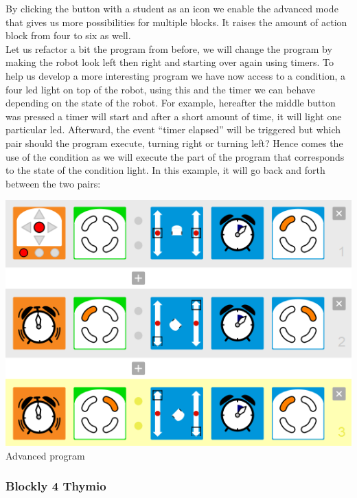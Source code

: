 \documentclass{scrartcl}
\begin{document}
By clicking the button with a student as an icon we enable the advanced mode that gives us more possibilities for multiple blocks. It raises the amount of action block from four to six as well. \\

Let us refactor a bit the program from before, we will change the program by making the robot look left then right and starting over again using timers. 
To help us develop a more interesting program we have now access to a condition, a four led light on top of the robot, using this and the timer we can behave depending on the state of the robot. 
For example, hereafter the middle button was pressed a timer will start and after a short amount of time, it will light one particular led. 
Afterward, the event “timer elapsed” will be triggered but which pair should the program execute, turning right or turning left? 
Hence comes the use of the condition as we will execute the part of the program that corresponds to the state of the condition light. 
In this example, it will go back and forth between the two pairs: \\
\begin{center}
  \includegraphics[scale=0.5]{./VPL/middlebtn_3E_adv}\\
  Advanced program
\end{center}

\subsubsection{Blockly 4 Thymio}
\end{document}
